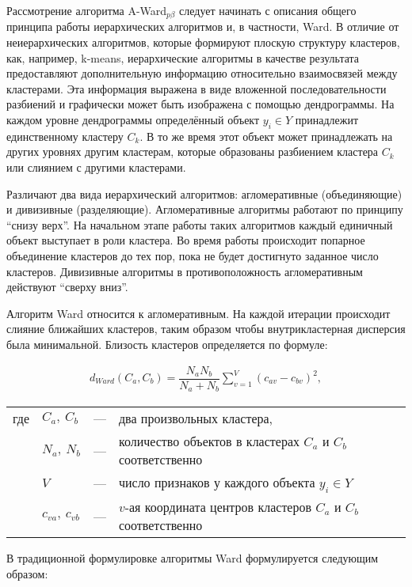 \documentclass[12pt]{a&t}
\begin{document}
Рассмотрение алгоритма \mbox{A-Ward$ _{p\beta} $} следует начинать с описания общего принципа работы иерархических алгоритмов и, в частности, Ward. В отличие от неиерархических алгоритмов, которые формируют плоскую структуру кластеров, как, например, \mbox{k-means}, иерархические алгоритмы в качестве результата предоставляют дополнительную информацию относительно взаимосвязей между кластерами. Эта информация выражена в виде вложенной последовательности разбиений \cite{Amorim-Makarenkov-Mirkin} и графически может быть изображена с помощью дендрограммы. На каждом уровне дендрограммы определённый объект $ y_i \in Y$ принадлежит единственному кластеру $ C_k $. В то же время этот объект может принадлежать на других уровнях другим кластерам, которые образованы разбиением кластера $ C_k $ или слиянием с другими кластерами. 

Различают два вида иерархический  алгоритмов: агломеративные (объединяющие) и дивизивные (разделяющие). Агломеративные алгоритмы работают по принципу ``снизу верх''. На начальном этапе работы таких алгоритмов каждый единичный объект выступает в роли кластера. Во время работы происходит попарное объединение кластеров до тех пор, пока не будет достигнуто заданное число кластеров. Дивизивные алгоритмы в противоположность агломеративным действуют ``сверху вниз''.

Алгоритм Ward относится к агломеративным. На каждой итерации происходит слияние ближайших кластеров, таким образом чтобы внутрикластерная дисперсия была минимальной. Близость кластеров определяется по формуле:

\begin{gather} \label{eq:ward-distance}
	d_{Ward}(C_a,C_b)=\dfrac{N_aN_b}{N_a+N_b}\sum_{v=1}^{V}(c_{av}-c_{bv})^2,
\end{gather}

\begin{tabular}{llll}
	где & $ C_a,\:C_b $ & {---} & два произвольных кластера, \\
	& $ N_a,\:N_b $ & {---} & количество объектов в кластерах $ C_a $ и $ C_b $ соответственно \\
	& $ V $ & {---} & число признаков у каждого объекта $ y_i \in Y $ \\
	& $ c_{va},\:c_{vb} $ & {---} & $ v $-ая координата центров кластеров $ C_a $ и $ C_b $ соответственно 
\end{tabular}

В традиционной формулировке алгоритмы Ward формулируется следующим образом:
\end{document}
